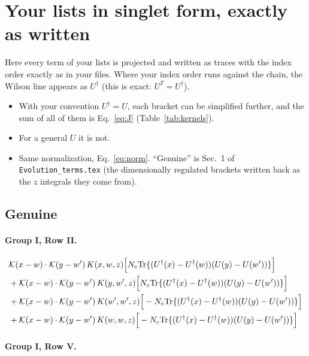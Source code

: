 \documentclass[10pt]{article}
\numberwithin{equation}{section}
\begin{document}
\section{Your lists in singlet form, exactly as written}\label{app:lists}
Here every term of your lists is projected and written as traces with the index order exactly as in your files. Where your index order runs against the chain, the Wilson line appears as $U^\dagger$ (this is exact: $U^T=U^\dagger$).
\begin{itemize}
\item With your convention $U^\dagger=U$, each bracket can be simplified further, and the sum of all of them is Eq.~\eqref{eq:J} (Table~\ref{tab:kernels}).
\item For a general $U$ it is not.
\item Same normalization, Eq.~\eqref{eq:norm}. ``Genuine'' is Sec.~1 of \texttt{Evolution\_terms.tex} (the dimensionally regulated brackets written back as the $z$ integrals they come from).
\end{itemize}

\subsection{\texorpdfstring{Genuine}{Genuine}}

\paragraph{Group I, Row II.}

\begin{align}
&\mathcal K(x-w)\cdot\mathcal K(y-w')\,K(x,w,z)\Big[N_c{\rm Tr}\{(U^\dagger(x)-U^\dagger(w))(U(y)-U(w'))\}\Big]\notag\\
&+\mathcal K(x-w)\cdot\mathcal K(y-w')\,K(y,w',z)\Big[N_c{\rm Tr}\{(U^\dagger(x)-U^\dagger(w))(U(y)-U(w'))\}\Big]\notag\\
&+\mathcal K(x-w)\cdot\mathcal K(y-w')\,K(w',w',z)\Big[-N_c{\rm Tr}\{(U^\dagger(x)-U^\dagger(w))(U(y)-U(w'))\}\Big]\notag\\
&+\mathcal K(x-w)\cdot\mathcal K(y-w')\,K(w,w,z)\Big[-N_c{\rm Tr}\{(U^\dagger(x)-U^\dagger(w))(U(y)-U(w'))\}\Big]
\label{eq:list0}
\end{align}

\paragraph{Group I, Row V.}
\end{document}
